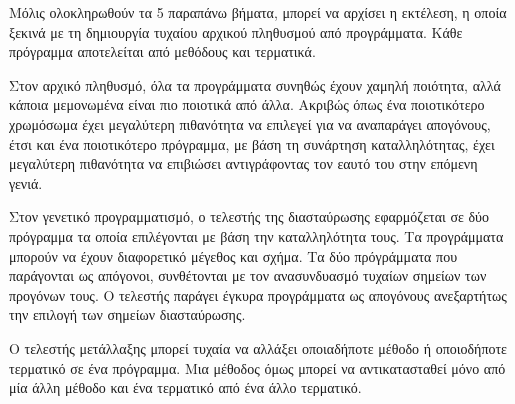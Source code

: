 Μόλις ολοκληρωθούν τα 5 παραπάνω βήματα, μπορεί να αρχίσει η εκτέλεση, η οποία ξεκινά με τη δημιουργία τυχαίου αρχικού πληθυσμού από προγράμματα. Κάθε πρόγραμμα αποτελείται από μεθόδους και τερματικά.

Στον αρχικό πληθυσμό, όλα τα προγράμματα συνηθώς έχουν χαμηλή ποιότητα, αλλά κάποια μεμονωμένα είναι πιο ποιοτικά από άλλα. Ακριβώς όπως ένα ποιοτικότερο χρωμόσωμα έχει μεγαλύτερη πιθανότητα να επιλεγεί για να αναπαράγει απογόνους, έτσι και ένα ποιοτικότερο πρόγραμμα, με βάση τη συνάρτηση καταλληλότητας, έχει μεγαλύτερη πιθανότητα να επιβιώσει αντιγράφοντας τον εαυτό του στην επόμενη γενιά.

Στον γενετικό προγραμματισμό, ο τελεστής της διασταύρωσης εφαρμόζεται σε δύο πρόγραμμα τα οποία επιλέγονται με βάση την καταλληλότητα τους. Τα προγράμματα μπορούν να έχουν διαφορετικό μέγεθος και σχήμα. Τα δύο πρόγράμματα που παράγονται ως απόγονοι, συνθέτονται με τον ανασυνδυασμό τυχαίων σημείων των προγόνων τους. Ο τελεστής παράγει έγκυρα προγράμματα ως απογόνους ανεξαρτήτως την επιλογή των σημείων διασταύρωσης.

Ο τελεστής μετάλλαξης μπορεί τυχαία να αλλάξει οποιαδήποτε μέθοδο ή οποιοδήποτε τερματικό σε ένα πρόγραμμα. Μια μέθοδος όμως μπορεί να αντικατασταθεί μόνο από μία άλλη μέθοδο και ένα τερματικό από ένα άλλο τερματικό.





